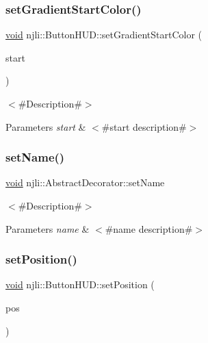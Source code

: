 \subsubsection{\texorpdfstring{set\+Gradient\+Start\+Color()}{setGradientStartColor()}}
{\footnotesize\ttfamily \mbox{\hyperlink{_thread_8h_af1e856da2e658414cb2456cb6f7ebc66}{void}} njli\+::\+Button\+H\+U\+D\+::set\+Gradient\+Start\+Color (\begin{DoxyParamCaption}\item[{const bt\+Vector4 \&}]{start }\end{DoxyParamCaption})}

$<$\#\+Description\#$>$


\begin{DoxyParams}{Parameters}
{\em start} & $<$\#start description\#$>$ \\
\hline
\end{DoxyParams}
\mbox{\label{classnjli_1_1_button_h_u_d_a087eb5f8d9f51cc476f12f1d10a3cb95}} 
\subsubsection{\texorpdfstring{set\+Name()}{setName()}}
{\footnotesize\ttfamily \mbox{\hyperlink{_thread_8h_af1e856da2e658414cb2456cb6f7ebc66}{void}} njli\+::\+Abstract\+Decorator\+::set\+Name}

$<$\#\+Description\#$>$


\begin{DoxyParams}{Parameters}
{\em name} & $<$\#name description\#$>$ \\
\hline
\end{DoxyParams}
\mbox{\label{classnjli_1_1_button_h_u_d_a3a5f2b5ddaab37fc50633902f8365927}} 
\subsubsection{\texorpdfstring{set\+Position()}{setPosition()}}
{\footnotesize\ttfamily \mbox{\hyperlink{_thread_8h_af1e856da2e658414cb2456cb6f7ebc66}{void}} njli\+::\+Button\+H\+U\+D\+::set\+Position (\begin{DoxyParamCaption}\item[{const bt\+Vector2 \&}]{pos }\end{DoxyParamCaption})}

